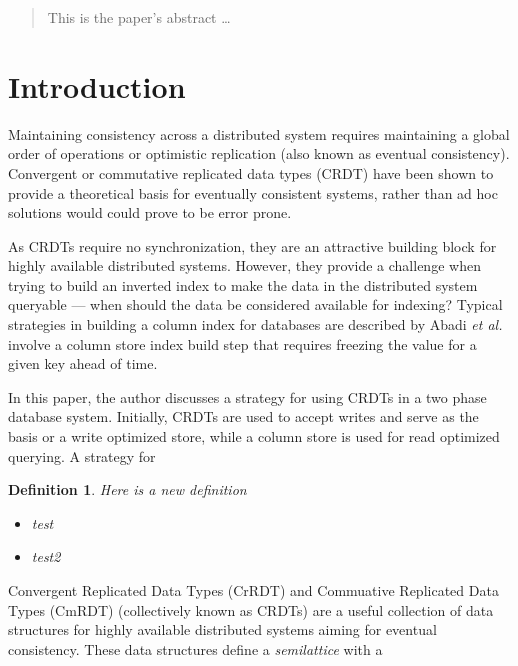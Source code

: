 \documentclass[12pt]{article}
\newtheorem{mydef}{Definition}
\begin{document}
\maketitle

\begin{abstract}
This is the paper's abstract \ldots
\end{abstract}

\section{Introduction}

Maintaining consistency across a distributed system requires maintaining a global order of
operations or optimistic replication (also known as eventual consistency). Convergent or commutative
replicated data types (CRDT) have been shown to provide a theoretical basis for eventually consistent
systems, rather than ad hoc solutions would could prove to be error prone. \cite{crdt2011}

As CRDTs require no synchronization, they are an attractive building block for highly available
distributed systems. However, they provide a challenge when trying to build an inverted index
to make the data in the distributed system queryable --- when should the data be considered
available for indexing? Typical strategies in building a column index for databases are described
by Abadi {\em et al.} involve a column store index build step that requires freezing the value
for a given key ahead of time. \cite{abadi}

In this paper, the author discusses a strategy for using CRDTs in a two phase database system.
Initially, CRDTs are used to accept writes and serve as the basis or a write optimized store, while
a column store is used for read optimized querying. A strategy for 


\begin{mydef}
Here is a new definition

\begin{itemize}

\item test
\item test2

\end{itemize}
\end{mydef}


Convergent Replicated Data Types (CrRDT) and Commuative Replicated Data Types (CmRDT)
(collectively known as CRDTs) are a useful collection of data structures for highly
available distributed systems aiming for eventual consistency. These data structures
define a {\em semilattice} with a  \cite{crdt2011}
\end{document}
